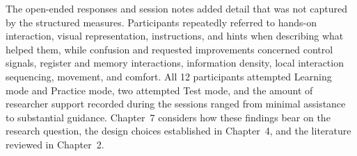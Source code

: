 The open-ended responses and session notes added detail that was not captured by the structured measures. Participants repeatedly referred to hands-on interaction, visual representation, instructions, and hints when describing what helped them, while confusion and requested improvements concerned control signals, register and memory interactions, information density, local interaction sequencing, movement, and comfort. All 12 participants attempted Learning mode and Practice mode, two attempted Test mode, and the amount of researcher support recorded during the sessions ranged from minimal assistance to substantial guidance. Chapter~7 considers how these findings bear on the research question, the design choices established in Chapter~4, and the literature reviewed in Chapter~2.

